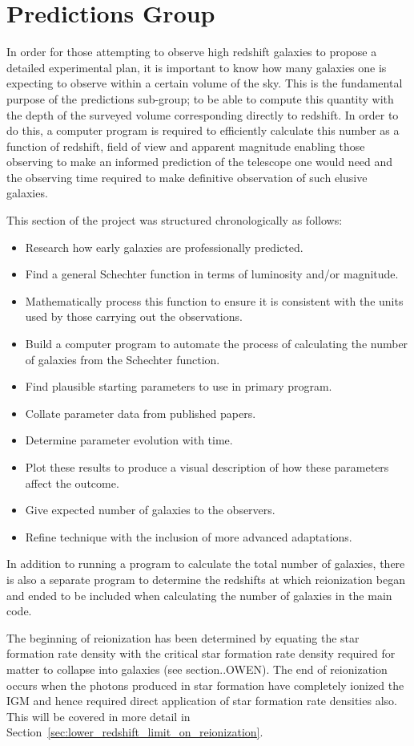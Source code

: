 
\section{Predictions Group} %
\label{sec:predictions_group}
	In order for those attempting to observe high redshift galaxies to propose a detailed experimental plan, it is important to know how many galaxies one is expecting to observe within a certain volume of the sky. This is the fundamental purpose of the predictions sub-group; to be able to compute this quantity with the depth of the surveyed volume corresponding directly to redshift. In order to do this, a computer program is required to efficiently calculate this number as a function of redshift, field of view and apparent magnitude enabling those observing to make an informed prediction of the telescope one would need and the observing time required to make definitive observation of such elusive galaxies.

	This section of the project was structured chronologically as follows:
	\begin{itemize}
		\item Research how early galaxies are professionally predicted.
		\item Find a general Schechter function in terms of luminosity and/or magnitude.
		\item Mathematically process this function to ensure it is consistent with the units used by those carrying out the observations.
		\item Build a computer program to automate the process of calculating the number of galaxies from the Schechter function.
		\item Find plausible starting parameters to use in primary program.
		\item Collate parameter data from published papers.
		\item Determine parameter evolution with time.
		\item Plot these results to produce a visual description of how these parameters affect the outcome.
		\item Give expected number of galaxies to the observers.
		\item Refine technique with the inclusion of more advanced adaptations.
	\end{itemize}

	In addition to running a program to calculate the total number of galaxies, there is also a separate program to determine the redshifts at which reionization began and ended to be included when calculating the number of galaxies in the main code.

	The beginning of reionization has been determined by equating the star formation rate density with the critical star formation rate density required for matter to collapse into galaxies (see section..OWEN). The end of reionization occurs when the photons produced in star formation have completely ionized the IGM and hence required direct application of star formation rate densities also. This will be covered in more detail in Section~\ref{sec:lower_redshift_limit_on_reionization}.


